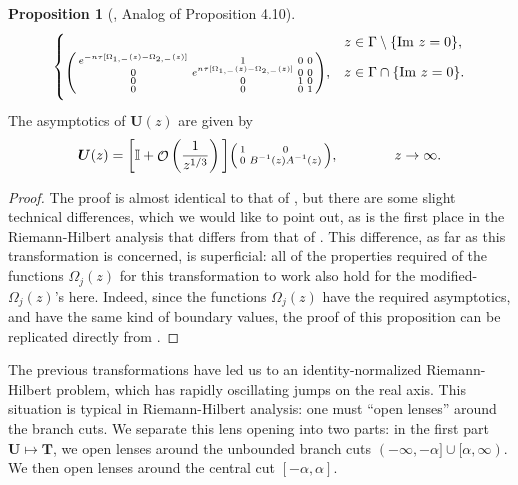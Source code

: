 \documentclass[usenames,dvipsnames]{article}
\theoremstyle{definition}
\newtheorem{prop}{Proposition}[section]
\DeclareMathOperator{\OO}{\mathcal{O}}
\numberwithin{equation}{section}
\numberwithin{figure}{section}
\begin{document}
\begin{prop}[\cite{DHL1}, Analog of Proposition 4.10]
\begin{align}
\begin{cases}
                        & z\in \Gamma \setminus \{\text{Im } z = 0\},\\
                        \vspace{2mm}
                        \begin{psmallmatrix}
                            e^{-n\tau[\Omega_{1,-}(z)-\Omega_{2,-}(z)]} & 1 & 0 & 0\\
                            0 & e^{n\tau[\Omega_{1,-}(z)-\Omega_{2,-}(z)]} & 0 & 0\\
                            0 & 0 & 1 & 0 \\
                            0 & 0 & 0 & 1
                        \end{psmallmatrix},
                        & z\in \Gamma \cap \{\text{Im } z = 0\}.
                    \end{cases}
            \end{align}
        The asymptotics of $\boldsymbol{U}(z)$ are given by
 \begin{equation} \label{U-asymptotics}
            \boldsymbol{U}(z) =
            \bigg[\mathbb{I} + \OO\left(\frac{1}{z^{1/3}}\right)\bigg]\begin{psmallmatrix}
                1 & 0\\
                0 & B^{-1}(z) A^{-1}(z) 
            \end{psmallmatrix}, \qquad \qquad z\to \infty.
    \end{equation}
\end{prop}
\begin{proof}
    The proof is almost identical to that of \cite{DHL1}, but there are some slight technical differences, which we would like to point out, as is the first place in the Riemann-Hilbert analysis that differs from that of \cite{DHL1}. This difference, as far as this 
    transformation is concerned, is superficial: all of the properties required of the functions $\Omega_j(z)$ for this transformation to 
    work also hold for the modified-$\Omega_j(z)$'s here. Indeed, since the functions $\Omega_j(z)$ have the required asymptotics,
    and have the same kind of boundary values, the proof of this proposition can be replicated directly from \cite{DHL1}.
\end{proof}








The previous transformations have led us to an identity-normalized Riemann-Hilbert problem, which has rapidly oscillating jumps on the real axis. This situation is typical in Riemann-Hilbert analysis: one must ``open lenses'' around the branch cuts. We separate this
lens opening into two parts: in the first part $\boldsymbol{U} \mapsto \boldsymbol{T}$, we open lenses around the unbounded branch cuts 
$(-\infty,-\alpha] \cup [\alpha,\infty)$. We then open lenses around the central cut $[-\alpha,\alpha]$.
\end{document}
